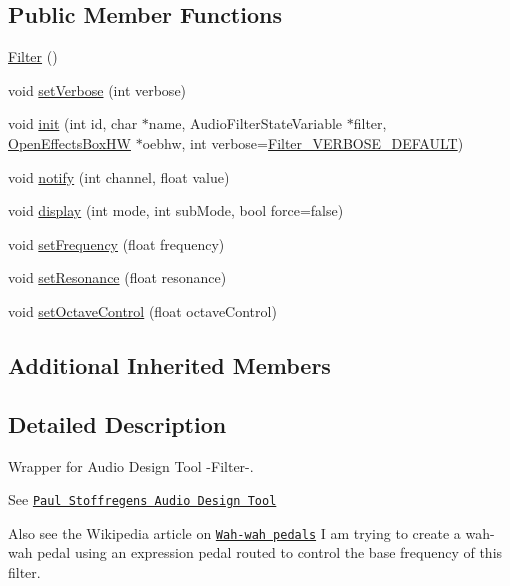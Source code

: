 \subsection*{Public Member Functions}
\begin{DoxyCompactItemize}
\item 
\mbox{\hyperlink{class_filter_ad15994c30d497afd567a6445446a249e}{Filter}} ()
\item 
void \mbox{\hyperlink{class_filter_aff18613de2ab3bc90035babc58c7b055}{set\+Verbose}} (int verbose)
\item 
void \mbox{\hyperlink{class_filter_acff0d2a488a223caa11d48a6147c7feb}{init}} (int id, char $\ast$name, Audio\+Filter\+State\+Variable $\ast$filter, \mbox{\hyperlink{class_open_effects_box_h_w}{Open\+Effects\+Box\+HW}} $\ast$oebhw, int verbose=\mbox{\hyperlink{_filter_8h_aeedb664ae18205202837764d021883e7}{Filter\+\_\+\+V\+E\+R\+B\+O\+S\+E\+\_\+\+D\+E\+F\+A\+U\+LT}})
\item 
void \mbox{\hyperlink{class_filter_a9cdce58ac2fe0b8beb6d561ab3725041}{notify}} (int channel, float value)
\item 
void \mbox{\hyperlink{class_filter_a3a2062c5c576d18cd734546ca41d29ad}{display}} (int mode, int sub\+Mode, bool force=false)
\item 
void \mbox{\hyperlink{class_filter_afe0720f8c3ed40208ebe59d894bf0645}{set\+Frequency}} (float frequency)
\item 
void \mbox{\hyperlink{class_filter_a9bd50f058259b8c3bc83daf99cdc9837}{set\+Resonance}} (float resonance)
\item 
void \mbox{\hyperlink{class_filter_ad4e47469cb53f7c7e3f95021c30599cc}{set\+Octave\+Control}} (float octave\+Control)
\end{DoxyCompactItemize}
\subsection*{Additional Inherited Members}


\subsection{Detailed Description}
Wrapper for Audio Design Tool -\/\+Filter-\/. 

See \href{https://www.pjrc.com/teensy/gui/}{\tt Paul Stoffregen\textquotesingle{}s Audio Design Tool}

Also see the Wikipedia article on \href{https://en.wikipedia.org/wiki/Wah-wah_pedal}{\tt Wah-\/wah pedals} I am trying to create a wah-\/wah pedal using an expression pedal routed to control the base frequency of this filter. 

